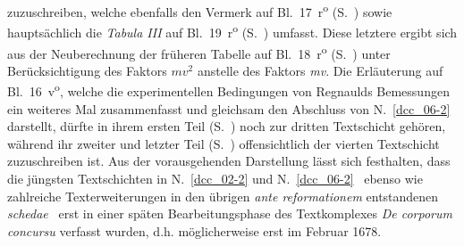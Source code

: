 zuzuschreiben, welche ebenfalls den Vermerk auf Bl.~17~r\textsuperscript{o} (S.~) sowie hauptsächlich die \textit{Tabula III} auf Bl.~19~r\textsuperscript{o} (S.~\pageref{LH_35_09_23_019r_tab3}) umfasst.
Diese letztere ergibt sich aus der Neuberechnung der früheren Tabelle auf Bl.~18~r\textsuperscript{o} (S.~\pageref{LH_35_09_23_018r_tab2}) unter Berücksichtigung des Faktors $\displaystyle mv^2$ anstelle des Faktors \textit{mv}.
Die Erläuterung auf Bl.~16~v\textsuperscript{o}, welche die experimentellen Bedingungen von Regnaulds%
\protect{}
Bemessungen ein weiteres Mal zusammenfasst und gleichsam den Abschluss von N.~\ref{dcc_06-2} %
darstellt, dürfte in ihrem ersten Teil (S.~) noch zur dritten Textschicht gehören, während ihr zweiter und letzter Teil (S.~) offensichtlich der vierten Textschicht zuzuschreiben ist.%
\pend%
%
\pstart%
Aus der vorausgehenden Darstellung lässt sich festhalten, dass die jüngsten Textschichten in N.~\ref{dcc_02-2} %
und N.~\ref{dcc_06-2} %
\textendash\ ebenso wie zahlreiche Texterweiterungen in den übrigen \textit{ante reformationem} entstandenen \textit{schedae} \textendash\ erst in einer späten Bearbeitungsphase des Textkomplexes \textit{De corporum concursu} verfasst wurden, d.h. möglicherweise erst im Februar 1678.
\pend%
\normalsize
%
%
\frenchspacing%
%
%